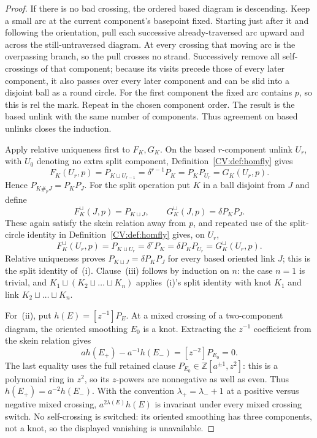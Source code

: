 \begin{proof}
If there is no bad crossing, the ordered based diagram is descending. Keep a
small arc at the current component's basepoint fixed. Starting just after it
and following the orientation, pull each successive already-traversed arc
upward and across the still-untraversed diagram. At every crossing that moving
arc is the overpassing branch, so the pull crosses no strand. Successively
remove all self-crossings of that component; because its visits precede those
of every later component, it also passes over every later component and can be
slid into a disjoint ball as a round circle. For the first component the fixed
arc contains $p$, so this is rel the mark. Repeat in the chosen component
order. The result is the based unlink with the same number of components.
Thus agreement on based unlinks closes the induction.

Apply relative uniqueness first to $F_K,G_K$. On the based $r$-component
unlink $U_r$, with $U_0$ denoting no extra split component,
Definition~\ref{CV:def:homfly} gives
\[
 F_K(U_r,p)=P_{K\sqcup U_{r-1}}=\delta^{r-1}P_K
 =P_KP_{U_r}=G_K(U_r,p).
\]
Hence $P_{K\#_pJ}=P_KP_J$. For the split operation put $K$ in a ball
disjoint from $J$ and define
\[
 F_K^{\sqcup}(J,p)=P_{K\sqcup J},\qquad
 G_K^{\sqcup}(J,p)=\delta P_KP_J.
\]
These again satisfy the skein relation away from $p$, and repeated use of the
split-circle identity in Definition~\ref{CV:def:homfly} gives, on $U_r$,
\[
 F_K^{\sqcup}(U_r,p)=P_{K\sqcup U_r}=\delta^rP_K
 =\delta P_KP_{U_r}=G_K^{\sqcup}(U_r,p).
\]
Relative uniqueness proves $P_{K\sqcup J}=\delta P_KP_J$ for every based
oriented link $J$; this is the split identity of~(i). Clause~(iii) follows by
induction on $n$: the case $n=1$ is trivial, and
$K_1\sqcup(K_2\sqcup\dots\sqcup K_n)$ applies~(i)'s split identity with knot
$K_1$ and link $K_2\sqcup\dots\sqcup K_n$.

For~(ii), put $h(E)=[z^{-1}]P_E$. At a mixed crossing of a two-component
diagram, the oriented smoothing $E_0$ is a knot. Extracting the $z^{-1}$
coefficient from the skein relation gives
\[
 a h(E_+)-a^{-1}h(E_-)=[z^{-2}]P_{E_0}=0.
\]
The last equality uses the full retained clause
$P_{E_0}\in\mathbb Z[a^{\pm1},z^2]$: this is a polynomial ring in $z^2$, so
its $z$-powers are nonnegative as well as even. Thus
$h(E_+)=a^{-2}h(E_-)$. With the convention
$\lambda_+=\lambda_-+1$ at a positive versus negative mixed crossing,
$a^{2\lambda(E)}h(E)$ is invariant under every mixed crossing switch.
No self-crossing is switched: its oriented smoothing has three components,
not a knot, so the displayed vanishing is unavailable.


\end{proof}
